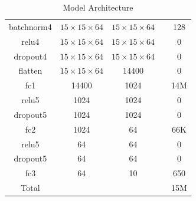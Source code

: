 \documentclass{article}
\begin{document}
\begin{sloppypar}
\begin{center}
\begin{table}[!h]
\begin{tabular}{|c|c|c|c|c|}
                batchnorm4 & $15\times 15\times 64$ & $15\times 15\times 64$ & & 128\\
                relu4 & $15\times 15\times 64$ & $15\times 15\times 64$ & & 0\\
                dropout4 & $15\times 15\times 64$ & $15\times 15\times 64$ & & 0\\
                \hline
                flatten & $15\times 15\times 64$ & 14400 & & 0\\
                \hline
                fc1 & 14400 & 1024 & & 14M\\
                relu5 & 1024 & 1024 & & 0\\
                dropout5 & 1024 & 1024 & & 0\\
                \hline
                fc2 & 1024 & 64 & & 66K\\
                relu5 & 64 & 64 & & 0\\
                dropout5 & 64 & 64 & & 0\\
                \hline
                fc3 & 64 & 10 & & 650\\
                \hline \hline
                Total & & & & 15M\\
                \hline
            \end{tabular}
            \caption{\label{table-1}Model Architecture}
        \end{table}
    \end{center}


\end{sloppypar}
\end{document}
